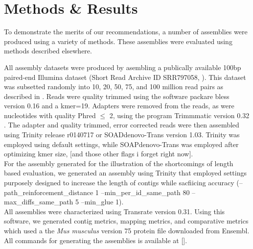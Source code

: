 \section*{Methods & Results}

To demonstrate the merits of our recommendations, a number of assemblies were produced using a variety of methods. These assemblies were evaluated using methods described elsewhere. 

All assembly datasets were produced by asembling a publically available 100bp paired-end Illumina dataset (Short Read Archive ID SRR797058, \citep{Macfarlan:2012js}). This dataset was subsetted randomly into 10, 20, 50, 75, and 100 million read pairs as described in \citep{MacManes:2014io}. Reads were quality trimmed using the software packare bless version 0.16 \citep{Heo:2014cb} and a kmer=19.  Adapters were removed from the reads, as were nucleotides with quality Phred $\leq$ 2, using the program Trimmmatic version 0.32 \citep{Bolger:2014ek}. The adapter and quality trimmed, error corrected reads were then assembled using Trinity release r0140717 or SOADdenovo-Trans version 1.03. Trinity was employed using default settings, while SOAPdenovo-Trans was employed after optimizing kmer size, [and those other flags i forget right now]. \\

For the assembly generated for the illustration of the shortcomings of length based evaluation, we generated an assembly using Trinity that employed settings purposely designed to increase the length of contigs while sacfiicing accuracy (--path_reinforcement_distance 1 --min_per_id_same_path 80  --max_diffs_same_path 5 --min_glue 1). \\

All assemblies were characterized using Transrate version 0.31. Using this software, we generated contig metrics, mapping metrics, and comparative metrics which used a the \textit{Mus musculus} version 75 protein file downloaded from Ensembl. All commands for generating the assemblies is available at [].  